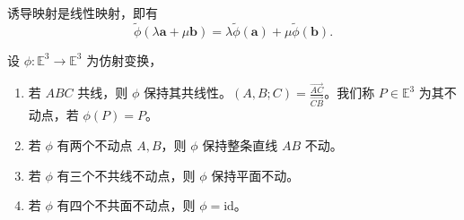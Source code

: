 \documentclass[lang=cn,10pt,thmcnt=section]{elegantbook}
\renewcommand{\vec}[1]{\mathbf{#1}}
\begin{document}
\begin{theorem}
    诱导映射是线性映射，即有
\[
\widetilde{\phi}(\lambda \vec{a} + \mu \vec{b}) = \lambda \widetilde{\phi}(\vec{a}) + \mu \widetilde{\phi}(\vec{b}).
\]
\end{theorem}
\begin{lemma}
    设 $\phi: \mathbb{E}^3 \rightarrow \mathbb{E}^3$ 为仿射变换，
    \begin{enumerate}
        \item 若 $ABC$ 共线，则 $\phi$ 保持其共线性。$(A, B; C) = \frac{\overrightarrow{AC}}{\overrightarrow{CB}}$。我们称 $P \in \mathbb{E}^3$ 为其不动点，若 $\phi(P) = P$。
        \item 若 $\phi$ 有两个不动点 $A, B$，则 $\phi$ 保持整条直线 $AB$ 不动。
        \item 若 $\phi$ 有三个不共线不动点，则 $\phi$ 保持平面不动。
        \item 若 $\phi$ 有四个不共面不动点，则 $\phi = \text{id}$。
    \end{enumerate}
\end{lemma}
\end{document}
